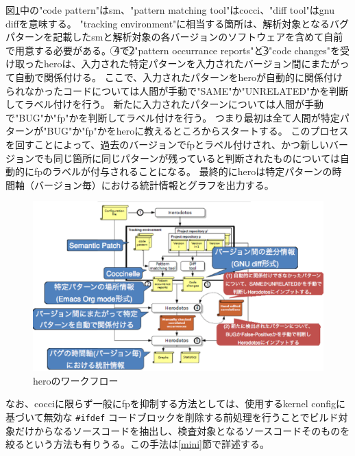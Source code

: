 図\ref{heroview}中の"code pattern"は\acrshort{sm}、"pattern matching tool"は\acrshort{cocci}、"diff tool"は\acrshort{gnu} diffを意味する。
"tracking environment"に相当する箇所は、解析対象となるバグパターンを記載した\acrshort{sm}と解析対象の各バージョンのソフトウェアを含めて自前で用意する必要がある。
\textcircled{\scriptsize 4}で\textcircled{\scriptsize 2}"pattern occurrance reports"と\textcircled{\scriptsize 3}"code changes"を受け取った\acrshort{hero}は、入力された特定パターンを入力されたバージョン間にまたがって自動で関係付ける。
ここで、入力されたパターンを\acrshort{hero}が自動的に関係付けられなかったコードについては人間が手動で"SAME"か"UNRELATED"かを判断してラベル付けを行う。
新たに入力されたパターンについては人間が手動で"BUG"か"\acrshort{fp}"かを判断してラベル付けを行う。
つまり最初は全て人間が特定パターンが"BUG"か"\acrshort{fp}"かを\acrshort{hero}に教えるところからスタートする。
このプロセスを回すことによって、過去のバージョンで\acrshort{fp}とラベル付けされ、かつ新しいバージョンでも同じ箇所に同じパターンが残っていると判断されたものについては自動的に\acrshort{fp}のラベルが付与されることになる。
最終的に\acrshort{hero}は特定パターンの時間軸（バージョン毎）における統計情報とグラフを出力する。
\begin{figure}[ht]
  \centering
  \includegraphics[width=\textwidth]{pic/heroview.eps}
  \caption{\acrshort{hero}のワークフロー}
  \label{heroview}
\end{figure}
\par
なお、\acrshort{cocci}に限らず一般に\acrshort{fp}を抑制する方法としては、使用するkernel configに基づいて無効な \verb|#ifdef| コードブロックを削除する前処理を行うことでビルド対象だけからなるソースコードを抽出し、検査対象となるソースコードそのものを絞るという方法も有りうる。この手法は\ref{mini}節で詳述する。
